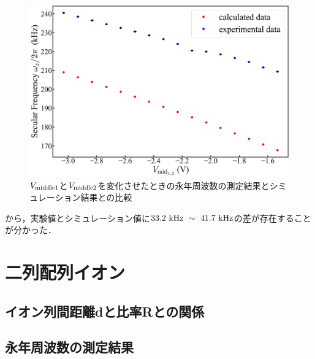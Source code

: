 \begin{figure}[h]
	\begin{center}
		\includegraphics[width = 0.6\linewidth]{./results/figure/Vmid-SecFreqZ.jpg}
		\caption{$V_{\rm middle1}$と$V_{\rm middle2}$を変化させたときの永年周波数の測定結果とシミュレーション結果との比較}
		\label{fig:mid12_MeasSec_SimSec}
	\end{center}
\end{figure}

から，実験値とシミュレーション値に$33.2 \ {\rm kHz} \ \sim \ 41.7 \ {\rm kHz}$の差が存在することが分かった．

\clearpage

\section{二列配列イオン}
\subsection{イオン列間距離dと比率Rとの関係}
\subsection{永年周波数の測定結果}

